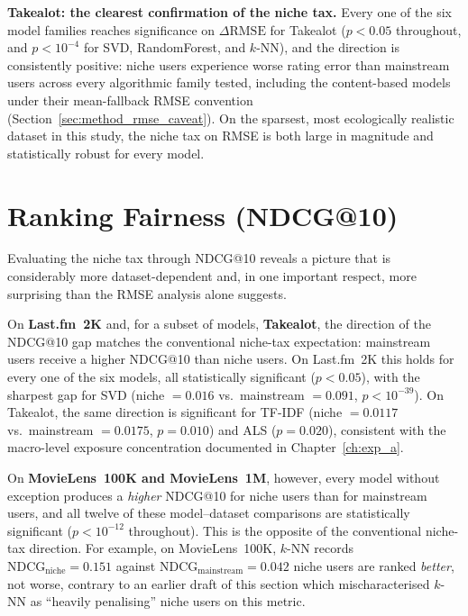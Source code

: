 \documentclass[11pt,a4paper]{report}
\begin{document}
\textbf{Takealot: the clearest confirmation of the niche tax.} Every one of the six model families reaches significance on $\Delta\mathrm{RMSE}$ for Takealot ($p < 0.05$ throughout, and $p < 10^{-4}$ for SVD, RandomForest, and $k$-NN), and the direction is consistently positive: niche users experience worse rating error than mainstream users across every algorithmic family tested, including the content-based models under their mean-fallback RMSE convention (Section~\ref{sec:method_rmse_caveat}). On the sparsest, most ecologically realistic dataset in this study, the niche tax on RMSE is both large in magnitude and statistically robust for every model.

\section{Ranking Fairness (NDCG@10)}
Evaluating the niche tax through NDCG@10 reveals a picture that is considerably more dataset-dependent and, in one important respect, more surprising than the RMSE analysis alone suggests.

On \textbf{Last.fm~2K} and, for a subset of models, \textbf{Takealot}, the direction of the NDCG@10 gap matches the conventional niche-tax expectation: mainstream users receive a higher NDCG@10 than niche users. On Last.fm~2K this holds for every one of the six models, all statistically significant ($p < 0.05$), with the sharpest gap for SVD (niche $= 0.016$ vs.\ mainstream $= 0.091$, $p < 10^{-39}$). On Takealot, the same direction is significant for TF-IDF (niche $= 0.0117$ vs.\ mainstream $= 0.0175$, $p = 0.010$) and ALS ($p = 0.020$), consistent with the macro-level exposure concentration documented in Chapter~\ref{ch:exp_a}.

On \textbf{MovieLens~100K and MovieLens~1M}, however, every model without exception produces a \emph{higher} NDCG@10 for niche users than for mainstream users, and all twelve of these model--dataset comparisons are statistically significant ($p < 10^{-12}$ throughout). This is the opposite of the conventional niche-tax direction. For example, on MovieLens~100K, $k$-NN records $\mathrm{NDCG}_{\text{niche}} = 0.151$ against $\mathrm{NDCG}_{\text{mainstream}} = 0.042$ niche users are ranked \emph{better}, not worse, contrary to an earlier draft of this section which mischaracterised $k$-NN as ``heavily penalising'' niche users on this metric.
\end{document}
